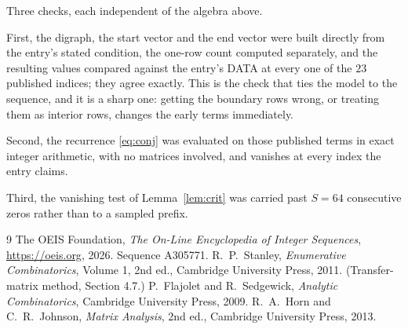 \documentclass[11pt,a4paper]{article}
\theoremstyle{plain}
\theoremstyle{definition}
\begin{document}
Three checks, each independent of the algebra above.

First, the digraph, the start vector and the end vector were built directly from the
entry's stated condition, the one-row count computed separately, and the resulting values
compared against the entry's DATA at every one of the $23$ published indices; they
agree exactly. This is the check that ties the model to the sequence, and it is a sharp one:
getting the boundary rows wrong, or treating them as interior rows, changes the early terms
immediately.

Second, the recurrence \eqref{eq:conj} was evaluated on those published terms in exact
integer arithmetic, with no matrices involved, and vanishes at every index the entry claims.

Third, the vanishing test of Lemma~\ref{lem:crit} was carried past $S=64$ consecutive
zeros rather than to a sampled prefix.

\begin{thebibliography}{9}
 The OEIS Foundation, \emph{The On-Line Encyclopedia of Integer
Sequences}, \url{https://oeis.org}, 2026. Sequence A305771.
 R.~P.~Stanley, \emph{Enumerative Combinatorics}, Volume 1, 2nd ed.,
Cambridge University Press, 2011. (Transfer-matrix method, Section 4.7.)
 P.~Flajolet and R.~Sedgewick, \emph{Analytic Combinatorics}, Cambridge
University Press, 2009.
 R.~A.~Horn and C.~R.~Johnson, \emph{Matrix Analysis}, 2nd ed., Cambridge
University Press, 2013.
\end{thebibliography}
\end{document}

